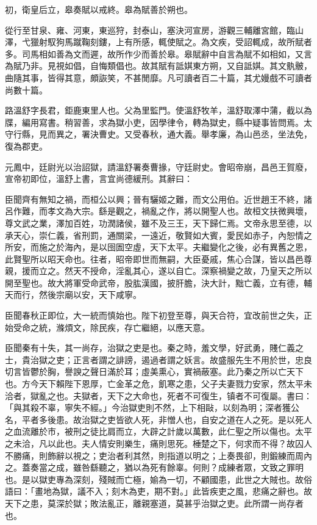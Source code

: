 \begin{pinyinscope}
初，衛皇后立，皋奏賦以戒終。皋為賦善於朔也。

從行至甘泉、雍、河東，東巡狩，封泰山，塞決河宣房，游觀三輔離宮館，臨山澤，弋獵射馭狗馬蹴鞠刻鏤，上有所感，輒使賦之。為文疾，受詔輒成，故所賦者多。司馬相如善為文而遲，故所作少而善於皋。皋賦辭中自言為賦不如相如，又言為賦乃非。見視如倡，自悔類倡也。故其賦有詆娸東方朔，又自詆娸。其文骫骳，曲隨其事，皆得其意，頗詼笑，不甚閒靡。凡可讀者百二十篇，其尤嫚戲不可讀者尚數十篇。

路溫舒字長君，鉅鹿東里人也。父為里監門。使溫舒牧羊，溫舒取澤中蒲，截以為牒，編用寫書。稍習善，求為獄小吏，因學律令，轉為獄史，縣中疑事皆問焉。太守行縣，見而異之，署決曹史。又受春秋，通大義。舉孝廉，為山邑丞，坐法免，復為郡吏。

元鳳中，廷尉光以治詔獄，請溫舒署奏曹掾，守廷尉史。會昭帝崩，昌邑王賀廢，宣帝初即位，溫舒上書，言宜尚德緩刑。其辭曰：

臣聞齊有無知之禍，而桓公以興；晉有驪姬之難，而文公用伯。近世趙王不終，諸呂作難，而孝文為大宗。繇是觀之，禍亂之作，將以開聖人也。故桓文扶微興壞，尊文武之業，澤加百姓，功潤諸侯，雖不及三王，天下歸仁焉。文帝永思至德，以承天心，崇仁義，省刑罰，通關梁，一遠近，敬賢如大賓，愛民如赤子，內恕情之所安，而施之於海內，是以囹圄空虛，天下太平。夫繼變化之後，必有異舊之恩，此賢聖所以昭天命也。往者，昭帝即世而無嗣，大臣憂戚，焦心合謀，皆以昌邑尊親，援而立之。然天不授命，淫亂其心，遂以自亡。深察禍變之故，乃皇天之所以開至聖也。故大將軍受命武帝，股肱漢國，披肝膽，決大計，黜亡義，立有德，輔天而行，然後宗廟以安，天下咸寧。

臣聞春秋正即位，大一統而慎始也。陛下初登至尊，與天合符，宜改前世之失，正始受命之統，滌煩文，除民疾，存亡繼絕，以應天意。

臣聞秦有十失，其一尚存，治獄之吏是也。秦之時，羞文學，好武勇，賤仁義之士，貴治獄之吏；正言者謂之誹謗，遏過者謂之妖言。故盛服先生不用於世，忠良切言皆鬱於胸，譽諛之聲日滿於耳；虛美熏心，實禍蔽塞。此乃秦之所以亡天下也。方今天下賴陛下恩厚，亡金革之危，飢寒之患，父子夫妻戮力安家，然太平未洽者，獄亂之也。夫獄者，天下之大命也，死者不可復生，镇者不可復屬。書曰：「與其殺不辜，寧失不經。」今治獄吏則不然，上下相敺，以刻為明；深者獲公名，平者多後患。故治獄之吏皆欲人死，非憎人也，自安之道在人之死。是以死人之血流離於市，被刑之徒比肩而立，大辟之計歲以萬數，此仁聖之所以傷也。太平之未洽，凡以此也。夫人情安則樂生，痛則思死。棰楚之下，何求而不得？故囚人不勝痛，則飾辭以視之；吏治者利其然，則指道以明之；上奏畏卻，則鍛練而周內之。蓋奏當之成，雖咎繇聽之，猶以為死有餘辜。何則？成練者眾，文致之罪明也。是以獄吏專為深刻，殘賊而亡極，媮為一切，不顧國患，此世之大賊也。故俗語曰：「畫地為獄，議不入；刻木為吏，期不對。」此皆疾吏之風，悲痛之辭也。故天下之患，莫深於獄；敗法亂正，離親塞道，莫甚乎治獄之吏。此所謂一尚存者也。


\end{pinyinscope}
